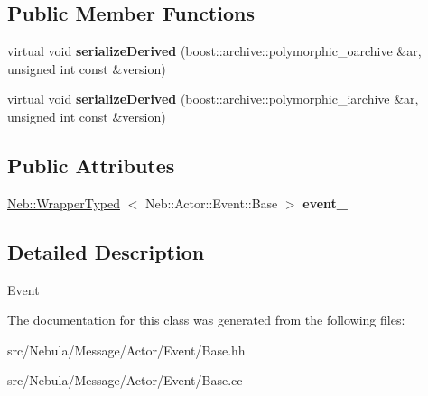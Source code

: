 \subsection*{\-Public \-Member \-Functions}
\begin{DoxyCompactItemize}
\item 
\hypertarget{classNeb_1_1Message_1_1Actor_1_1Event_a99cbd29786ba044e63a80eb1c065aaec}{virtual void {\bfseries serialize\-Derived} (boost\-::archive\-::polymorphic\-\_\-oarchive \&ar, unsigned int const \&version)}\label{classNeb_1_1Message_1_1Actor_1_1Event_a99cbd29786ba044e63a80eb1c065aaec}

\item 
\hypertarget{classNeb_1_1Message_1_1Actor_1_1Event_a0b593d0085c258e6c0a931a4ff6402b3}{virtual void {\bfseries serialize\-Derived} (boost\-::archive\-::polymorphic\-\_\-iarchive \&ar, unsigned int const \&version)}\label{classNeb_1_1Message_1_1Actor_1_1Event_a0b593d0085c258e6c0a931a4ff6402b3}

\end{DoxyCompactItemize}
\subsection*{\-Public \-Attributes}
\begin{DoxyCompactItemize}
\item 
\hypertarget{classNeb_1_1Message_1_1Actor_1_1Event_ae873cfb5d7b37e3509aabf26d281f30c}{\hyperlink{classNeb_1_1WrapperTyped}{\-Neb\-::\-Wrapper\-Typed}\*
$<$ \-Neb\-::\-Actor\-::\-Event\-::\-Base $>$ {\bfseries event\-\_\-}}\label{classNeb_1_1Message_1_1Actor_1_1Event_ae873cfb5d7b37e3509aabf26d281f30c}

\end{DoxyCompactItemize}


\subsection{\-Detailed \-Description}
\-Event 

\-The documentation for this class was generated from the following files\-:\begin{DoxyCompactItemize}
\item 
src/\-Nebula/\-Message/\-Actor/\-Event/\-Base.\-hh\item 
src/\-Nebula/\-Message/\-Actor/\-Event/\-Base.\-cc\end{DoxyCompactItemize}
